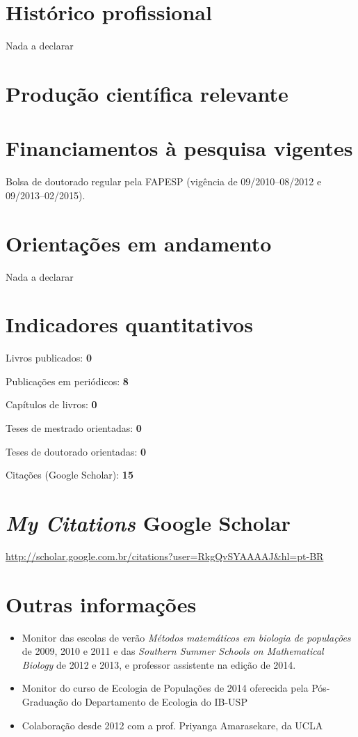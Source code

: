 \documentclass[a4paper ,11pt]{article}
\renewenvironment{enumerate}{
  \begin{list}{}{
    \setlength{\leftmargin}{2em}
  }
}{
  \end{list}
}
\begin{document}
\section{Histórico profissional}
Nada a declarar

\section{Produção científica relevante}

\renewcommand{\refname}{Artigos}

\nocite{*}



\section{Financiamentos à pesquisa vigentes}

Bolsa de doutorado regular pela FAPESP (vigência de 09/2010--08/2012 e 09/2013--02/2015).

\section{Orientações em andamento}
Nada a declarar

\section{Indicadores quantitativos}
\begin{enumerate}
    \item Livros publicados: \textbf{0}
    \item Publicações em periódicos: \textbf{8}
    \item Capítulos de livros: \textbf{0}
    \item Teses de mestrado orientadas: \textbf{0}
    \item Teses de doutorado orientadas: \textbf{0}
    \item Citações (Google Scholar): \textbf{15}
\end{enumerate}

\section{\emph{My Citations} Google Scholar}
\url{http://scholar.google.com.br/citations?user=RkgQvSYAAAAJ&hl=pt-BR}

\section{Outras informações}
\begin{itemize}
    \item Monitor das escolas de verão \emph{Métodos matemáticos em biologia de
populações} de 2009, 2010 e 2011 e das \emph{Southern Summer Schools on Mathematical
Biology} de 2012 e 2013, e professor assistente na edição de 2014.
    \item Monitor do curso de Ecologia de Populações de 2014 oferecida pela Pós-Graduação do Departamento de
Ecologia do IB-USP
    \item Colaboração desde 2012 com a prof. Priyanga Amarasekare, da UCLA
\end{itemize}
\end{document}
